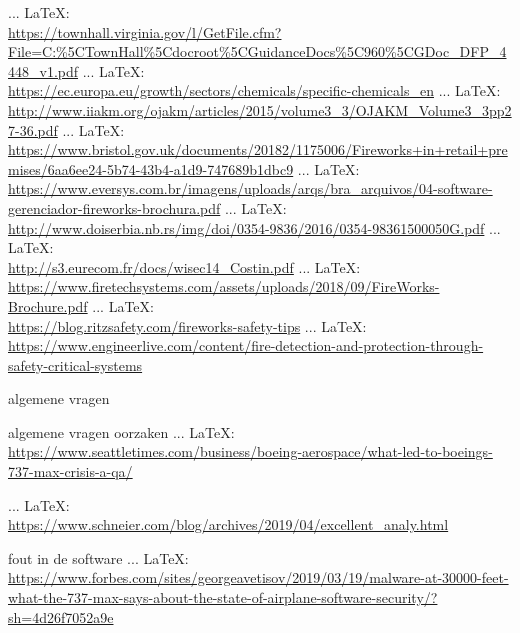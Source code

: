 \begin{thebibliography}{99}
{{{{{{{{							 ... \LaTeX:\\ \url{https://townhall.virginia.gov/l/GetFile.cfm?File=C:%5CTownHall%5Cdocroot%5CGuidanceDocs%5C960%5CGDoc_DFP_4448_v1.pdf}
							 ... \LaTeX:\\ \url{https://ec.europa.eu/growth/sectors/chemicals/specific-chemicals_en}
							 ... \LaTeX:\\ \url{http://www.iiakm.org/ojakm/articles/2015/volume3_3/OJAKM_Volume3_3pp27-36.pdf}
							 ... \LaTeX:\\ \url{https://www.bristol.gov.uk/documents/20182/1175006/Fireworks+in+retail+premises/6aa6ee24-5b74-43b4-a1d9-747689b1dbc9}
							 ... \LaTeX:\\ \url{https://www.eversys.com.br/imagens/uploads/arqs/bra_arquivos/04-software-gerenciador-fireworks-brochura.pdf}
							 ... \LaTeX:\\ \url{http://www.doiserbia.nb.rs/img/doi/0354-9836/2016/0354-98361500050G.pdf}
							 ... \LaTeX:\\ \url{http://s3.eurecom.fr/docs/wisec14_Costin.pdf}
							 ... \LaTeX:\\ \url{https://www.firetechsystems.com/assets/uploads/2018/09/FireWorks-Brochure.pdf}
							 ... \LaTeX:\\ \url{https://blog.ritzsafety.com/fireworks-safety-tips}
							 ... \LaTeX:\\ \url{https://www.engineerlive.com/content/fire-detection-and-protection-through-safety-critical-systems}
							
							algemene vragen
							
							algemene vragen
							oorzaken
							 ... \LaTeX:\\ \url{https://www.seattletimes.com/business/boeing-aerospace/what-led-to-boeings-737-max-crisis-a-qa/}
							
							 ... \LaTeX:\\ \url{https://www.schneier.com/blog/archives/2019/04/excellent_analy.html}
							
							fout in de software
							 ... \LaTeX:\\ \url{https://www.forbes.com/sites/georgeavetisov/2019/03/19/malware-at-30000-feet-what-the-737-max-says-about-the-state-of-airplane-software-security/?sh=4d26f7052a9e}
							
}}}}}}}}
\end{thebibliography}
